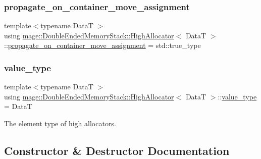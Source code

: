 \subsubsection{\texorpdfstring{propagate\+\_\+on\+\_\+container\+\_\+move\+\_\+assignment}{propagate\_on\_container\_move\_assignment}}
{\footnotesize\ttfamily template$<$typename DataT $>$ \\
using \hyperlink{structmage_1_1_double_ended_memory_stack_1_1_high_allocator}{mage\+::\+Double\+Ended\+Memory\+Stack\+::\+High\+Allocator}$<$ DataT $>$\+::\hyperlink{structmage_1_1_double_ended_memory_stack_1_1_high_allocator_a62088aeffb56b35539d9080aabc43134}{propagate\+\_\+on\+\_\+container\+\_\+move\+\_\+assignment} =  std\+::true\+\_\+type}

\hypertarget{structmage_1_1_double_ended_memory_stack_1_1_high_allocator_a43b87cea37b3bbba57ca794e9785e82d}{}\label{structmage_1_1_double_ended_memory_stack_1_1_high_allocator_a43b87cea37b3bbba57ca794e9785e82d} 
\subsubsection{\texorpdfstring{value\+\_\+type}{value\_type}}
{\footnotesize\ttfamily template$<$typename DataT $>$ \\
using \hyperlink{structmage_1_1_double_ended_memory_stack_1_1_high_allocator}{mage\+::\+Double\+Ended\+Memory\+Stack\+::\+High\+Allocator}$<$ DataT $>$\+::\hyperlink{structmage_1_1_double_ended_memory_stack_1_1_high_allocator_a43b87cea37b3bbba57ca794e9785e82d}{value\+\_\+type} =  DataT}

The element type of high allocators. 

\subsection{Constructor \& Destructor Documentation}
\hypertarget{structmage_1_1_double_ended_memory_stack_1_1_high_allocator_aaad727b10738064cffcb555252df5cfd}{}\label{structmage_1_1_double_ended_memory_stack_1_1_high_allocator_aaad727b10738064cffcb555252df5cfd} 
